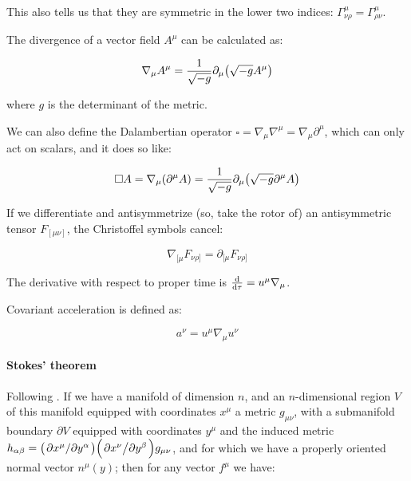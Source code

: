 \documentclass[main.tex]{subfiles}
\begin{document}
This also tells us that they are symmetric in the lower two indices: $\Gamma ^\mu _{\nu \rho} = \Gamma ^\mu _{\rho \nu}$.

The divergence of a vector field $A^\mu$ can be calculated as:

\begin{equation}
    \nabla_\mu A^\mu = \frac{1}{\sqrt{-g}}\partial_\mu \qty(\sqrt{-g}A^\mu) \label{eq:covariant-divergence}
\end{equation}

where $g$ is the determinant of the metric.

We can also define the Dalambertian operator $\square = \nabla_\mu \nabla^\mu = \nabla_\mu \partial^\mu$, which can only act on scalars, and it does so like:

\begin{equation}
    \square A = \nabla_\mu (\partial^\mu A) =  \frac{1}{\sqrt{-g}}\partial_\mu \qty(\sqrt{-g}\partial^\mu A)
\end{equation}

If we differentiate and antisymmetrize (so, take the rotor of) an antisymmetric tensor $F_{[\mu \nu]}$, the Christoffel symbols cancel:

\begin{equation}
    \nabla_{[\mu} F_{\nu\rho]} = \partial_{[\mu} F_{\nu\rho]}
\end{equation}

The derivative with respect to proper time is $\dv{}{\tau} = u^\mu \nabla_\mu$.

Covariant acceleration is defined as:

\begin{equation} \label{eq:covariant-acceleration-def}
    a^\nu = u^\mu \nabla_\mu u^\nu
\end{equation}

\paragraph{Stokes' theorem}

Following \cite[]{Unger:2016}.
If we have a manifold of dimension \(n\), and an \(n\)-dimensional region \(V\) of this manifold equipped with coordinates \(x^\mu\) a metric \(g_{\mu\nu}\), with a submanifold boundary \(\partial V\) equipped with coordinates \(y^\mu\) and the induced metric \(h_{\alpha\beta} = \qty(\pdv*{x^\mu}{y^\alpha}) \qty(\pdv*{x^\nu}{y^\beta}) g_{\mu\nu}\), and for which we have a properly oriented normal vector \(n^\mu (y)\); then for any vector \(f^\mu\) we have:
\end{document}
